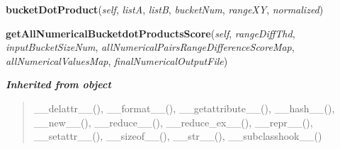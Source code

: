     \label{bucketDotProductMetrics:bucketDotProductMetrics:bucketDotProduct}

    \vspace{0.5ex}

\hspace{.8\funcindent}\begin{boxedminipage}{\funcwidth}

    \raggedright \textbf{bucketDotProduct}(\textit{self}, \textit{listA}, \textit{listB}, \textit{bucketNum}, \textit{rangeXY}, \textit{normalized})

\setlength{\parskip}{2ex}
\setlength{\parskip}{1ex}
    \end{boxedminipage}

    \label{bucketDotProductMetrics:bucketDotProductMetrics:getAllNumericalBucketdotProductsScore}

    \vspace{0.5ex}

\hspace{.8\funcindent}\begin{boxedminipage}{\funcwidth}

    \raggedright \textbf{getAllNumericalBucketdotProductsScore}(\textit{self}, \textit{rangeDiffThd}, \textit{inputBucketSizeNum}, \textit{allNumericalPairsRangeDifferenceScoreMap}, \textit{allNumericalValuesMap}, \textit{finalNumericalOutputFile})

\setlength{\parskip}{2ex}
\setlength{\parskip}{1ex}
    \end{boxedminipage}


\large{\textbf{\textit{Inherited from object}}}

\begin{quote}
\_\_delattr\_\_(), \_\_format\_\_(), \_\_getattribute\_\_(), \_\_hash\_\_(), \_\_new\_\_(), \_\_reduce\_\_(), \_\_reduce\_ex\_\_(), \_\_repr\_\_(), \_\_setattr\_\_(), \_\_sizeof\_\_(), \_\_str\_\_(), \_\_subclasshook\_\_()
\end{quote}


